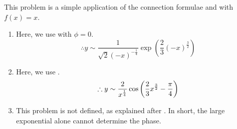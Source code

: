 \item
This problem is a simple application of the connection formulae  and  with $f(x) = x$.

\begin{enumerate}[wide, labelindent = 0pt, label = (\alph*)]
	\item Here, we use  with $\phi = 0$.
	      \[
		      \therefore y \sim \frac{1}{\sqrt{2} {(-x)}^{-\frac{1}{4}}} \exp\left( \frac{2}{3} {(-x)}^{\frac{3}{2}} \right)
	      \]
	\item Here, we use .
	      \[
		      \therefore y \sim \frac{2}{x^{\frac{1}{4}}} \cos\left( \frac{2}{3}x^{\frac{3}{2}} - \frac{\pi}{4} \right)
	      \]
	\item This problem is not defined, as explained after .
	      In short, the large exponential alone cannot determine the phase.

\end{enumerate}